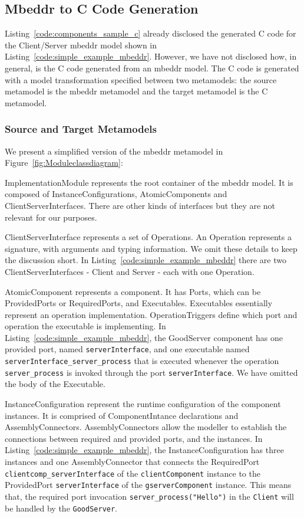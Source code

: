 \subsection{Mbeddr to C Code Generation}

Listing~\ref{code:components_sample_c} already disclosed the generated C code for the Client/Server mbeddr model shown in Listing~\ref{code:simple_example_mbeddr}. However, we have not disclosed how, in general, is the C code generated from an mbeddr model.
The C code is generated with a model transformation specified between two metamodels: the source metamodel is the mbeddr metamodel and the target metamodel is the C metamodel.

\subsubsection{Source and Target Metamodels}

We present a simplified version of the mbeddr metamodel in Figure~\ref{fig:Moduleclassdiagram}:
\begin{compactdesc}
	\item[ImplementationModule] represents the root container of the mbeddr model. It is composed of InstanceConfigurations, AtomicComponents and ClientServerInterfaces. There are other kinds of interfaces but they are not relevant for our purposes.
	\item[ClientServerInterface] represents a set of Operations. An Operation represents a signature, with arguments and typing information. We omit these details to keep the discussion short. In Listing~\ref{code:simple_example_mbeddr} there are two ClientServerInterfaces - Client and Server - each with one Operation.
	\item[AtomicComponent] represents a component. It has Ports, which can be ProvidedPorts or RequiredPorts, and Executables. Executables essentially represent an operation implementation. OperationTriggers define which port and operation the executable is implementing. In Listing~\ref{code:simple_example_mbeddr}, the GoodServer component has one provided port, named \verb=serverInterface=, and one executable named \verb=serverInterface_server_process= that is executed whenever the operation \verb=server_process= is invoked through the port \verb=serverInterface=. We have omitted the body of the Executable.
	\item[InstanceConfiguration] represent the runtime configuration of the component instances. It is comprised of ComponentIntance declarations and AssemblyConnectors. AssemblyConnectors allow the modeller to establish the connections between required and provided ports, and the instances.  In Listing~\ref{code:simple_example_mbeddr}, the InstanceConfiguration has three instances and one AssemblyConnector that connects the RequiredPort \verb=clientcomp_serverInterface= of the \verb=clientComponent= instance to the ProvidedPort \verb=serverInterface= of the \verb=gserverComponent= instance.
This means that, the required port invocation \verb=server_process("Hello")= in the \verb=Client= will be handled by the \verb=GoodServer=.
\end{compactdesc}

